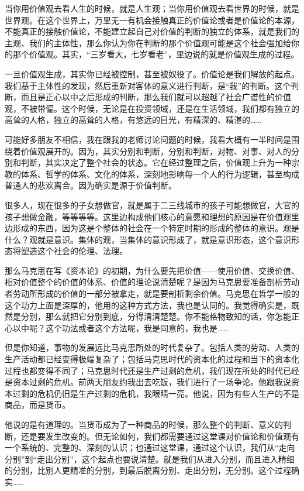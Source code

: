 \documentclass[UTF8, 12pt, a4paper]{ctexrep}
\begin{document}
当你用价值观去看人生的时候，就是人生观；当你用价值观去看世界的时候，就是世界观。在这个世界上，万里无一有机会接触真正的价值论或者是价值论的本源，不能真正的接触价值论，不能建立起自己对价值的判断的独立的体系，就是我们的主观、我们的主体性，那么你认为你在判断的那个价值观可能是这个社会强加给你的那个价值观。其实，“三岁看大，七岁看老”，里边说的就是价值观生成的过程。

一旦价值观生成，其实你已经被控制，甚至被奴役了。价值论是我们解放的起点。我们基于主体性的发现，然后重新对客体的意义进行判断，是“我”的判断。这个判断，而且是正心以中之后形成的判断，那么我们就可以超越了社会广谱性的价值观，不被带偏。这个时候，无论是在投资领域，还是在生活领域，我们都有独立的高耸的人格，独立的高耸的人格，有悠远的目光，有精深的、精湛的……

可能好多朋友不相信，我在跟我的老师讨论问题的时候，我看大概有一半时间是围绕着价值观展开的。因为，其实分别和判断，分别和判断，对物、对事、对人的分别和判断，其实决定了整个社会的状态。它在经过整理之后，价值观上升为一种宗教的体系、哲学的体系、文化的体系，深刻地影响每一个人的行为逻辑，甚至构成普通人的悲欢离合。因为确实是源于价值判断。

很多人，现在很多的子女想做官，就是属于二三线城市的孩子可能想做官，大官的孩子想做金融，等等等等。这里边构成他们核心的意愿和理想的原因是在价值观里边形成的东西，因为这是个整体的社会在一个特定时期的形成的整体的意识。观是什么？观就是意识。集体的观，当集体的意识形成了，就是意识形态，这个意识形态将塑造这个社会的伦理、法理。

那么马克思在写《资本论》的初期，为什么要先把价值——使用价值、交换价值、相对价值整个的价值的体系、价值的理论说清楚呢？是因为马克思要准备剖析劳动者劳动所形成的价值的一部分被拿走，就是要剖析剩余价值。马克思在哲学一般的这个功力上面是深厚的，他用的这种方式方法，我也是认同的。我觉得确实是，既然是分别，那么就把它分别到底，分得清清楚楚。你不能格物致知的话，你怎能正心以中呢？这个功法或者这个方法呢，我是同意的，我也是……

但是你知道，事物的发展远比马克思所处的时代复杂了。包括人类的劳动、人类的生产活动都已经变得极端复杂了；包括马克思时代的资本化的过程和当下的资本化过程也都变得不同了；马克思时代还是生产过剩的危机，我们现在所处的时代已经是资本过剩的危机。前两天朋友约我出去吃饭，我们进行了一场争论。他跟我说资本过剩的危机仍旧是生产过剩的危机，我眼睛一亮。他说，因为有些人生产的不是商品，而是货币。

他说的是有道理的。当货币成为了一种商品的时候，那么整个的判断、意义的判断，还是要发生改变的。但无论如何，我们都需要通过这堂课对价值论和价值观有一个系统的、完整的、深刻的认识；也通过这堂课，通过这个认识，我们从“走向分别”到“走出分别”，这个起点也要说清楚。就是我们从进入分别，而且进入精细的分别，比别人更精准的分别，到最后脱离分别、走出分别，无分别。这个过程确实……
\end{document}
